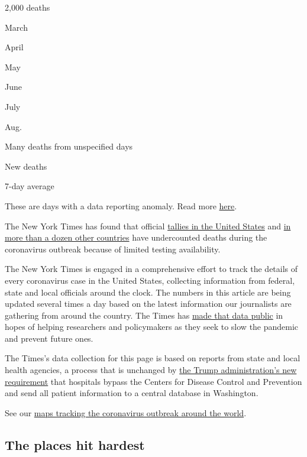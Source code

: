 2,000 deaths

March

April

May

June

July

Aug.

Many deaths from unspecified days

New deaths

7-day average

These are days with a data reporting anomaly. Read more
\protect\hyperlink{anomaly-notes}{here}.

The New York Times has found that official
\href{https://www.nytimes.com/interactive/2020/04/28/us/coronavirus-death-toll-total.html}{tallies
in the United States} and
\href{https://www.nytimes.com/interactive/2020/04/21/world/coronavirus-missing-deaths.html}{in
more than a dozen other countries} have undercounted deaths during the
coronavirus outbreak because of limited testing availability.

The New York Times is engaged in a comprehensive effort to track the
details of every coronavirus case in the United States, collecting
information from federal, state and local officials around the clock.
The numbers in this article are being updated several times a day based
on the latest information our journalists are gathering from around the
country. The Times has
\href{https://www.nytimes.com/article/coronavirus-county-data-us.html?action=click\&module=Spotlight\&pgtype=Homepage}{made
that data public} in hopes of helping researchers and policymakers as
they seek to slow the pandemic and prevent future ones.

The Times's data collection for this page is based on reports from state
and local health agencies, a process that is unchanged by
\href{https://www.nytimes.com/2020/07/14/us/politics/trump-cdc-coronavirus.html}{the
Trump administration's new requirement} that hospitals bypass the
Centers for Disease Control and Prevention and send all patient
information to a central database in Washington.

See our
\href{https://www.nytimes.com/interactive/2020/world/coronavirus-maps.html}{maps
tracking the coronavirus outbreak around the world}.

\hypertarget{the-places-hit-hardest}{%
\subsection{The places hit hardest}\label{the-places-hit-hardest}}

